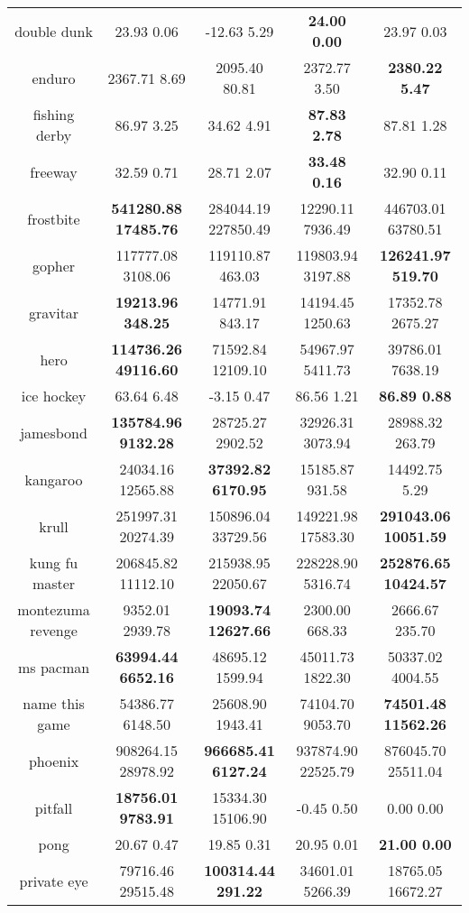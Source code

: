\documentclass{article}
\begin{document}
\begin{tabular}{|c|c|c|c|c|}
 double dunk & 23.93  0.06 & -12.63  5.29 & \bf{24.00  0.00} & 23.97  0.03 \\
 enduro & 2367.71  8.69 & 2095.40  80.81 & 2372.77  3.50 & \bf{2380.22  5.47} \\
 fishing derby & 86.97  3.25 & 34.62  4.91 & \bf{87.83  2.78} & 87.81  1.28 \\
 freeway & 32.59  0.71 & 28.71  2.07 & \bf{33.48  0.16} & 32.90  0.11 \\
 frostbite & \bf{541280.88  17485.76} & 284044.19  227850.49 & 12290.11  7936.49 & 446703.01  63780.51 \\
 gopher & 117777.08  3108.06 & 119110.87  463.03 & 119803.94  3197.88 & \bf{126241.97  519.70} \\
 gravitar & \bf{19213.96  348.25} & 14771.91  843.17 & 14194.45  1250.63 & 17352.78  2675.27 \\
 hero & \bf{114736.26  49116.60} & 71592.84  12109.10 & 54967.97  5411.73 & 39786.01  7638.19 \\
 ice hockey & 63.64  6.48 & -3.15  0.47 & 86.56  1.21 & \bf{86.89  0.88} \\
 jamesbond & \bf{135784.96  9132.28} & 28725.27  2902.52 & 32926.31  3073.94 & 28988.32  263.79 \\
 kangaroo & 24034.16  12565.88 & \bf{37392.82  6170.95} & 15185.87  931.58 & 14492.75  5.29 \\
 krull & 251997.31  20274.39 & 150896.04  33729.56 & 149221.98  17583.30 & \bf{291043.06  10051.59} \\
 kung fu master & 206845.82  11112.10 & 215938.95  22050.67 & 228228.90  5316.74 & \bf{252876.65  10424.57} \\
 montezuma revenge & 9352.01  2939.78 & \bf{19093.74  12627.66} & 2300.00  668.33 & 2666.67  235.70 \\
 ms pacman & \bf{63994.44  6652.16} & 48695.12  1599.94 & 45011.73  1822.30 & 50337.02  4004.55 \\
 name this game & 54386.77  6148.50 & 25608.90  1943.41 & 74104.70  9053.70 & \bf{74501.48  11562.26} \\
 phoenix & 908264.15  28978.92 & \bf{966685.41  6127.24} & 937874.90  22525.79 & 876045.70  25511.04 \\
 pitfall & \bf{18756.01  9783.91} & 15334.30  15106.90 & -0.45  0.50 & 0.00  0.00 \\
 pong & 20.67  0.47 & 19.85  0.31 & 20.95  0.01 & \bf{21.00  0.00} \\
 private eye & 79716.46  29515.48 & \bf{100314.44  291.22} & 34601.01  5266.39 & 18765.05  16672.27 \\

\end{tabular}
\end{document}
